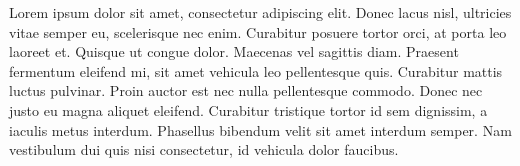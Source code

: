 
Lorem ipsum dolor sit amet, consectetur adipiscing elit. Donec lacus nisl, ultricies vitae semper eu, scelerisque nec enim. Curabitur posuere tortor orci, at porta leo laoreet et. Quisque ut congue dolor. Maecenas vel sagittis diam. Praesent fermentum eleifend mi, sit amet vehicula leo pellentesque quis. Curabitur mattis luctus pulvinar. Proin auctor est nec nulla pellentesque commodo. Donec nec justo eu magna aliquet eleifend. Curabitur tristique tortor id sem dignissim, a iaculis metus interdum. Phasellus bibendum velit sit amet interdum semper. Nam vestibulum dui quis nisi consectetur, id vehicula dolor faucibus.